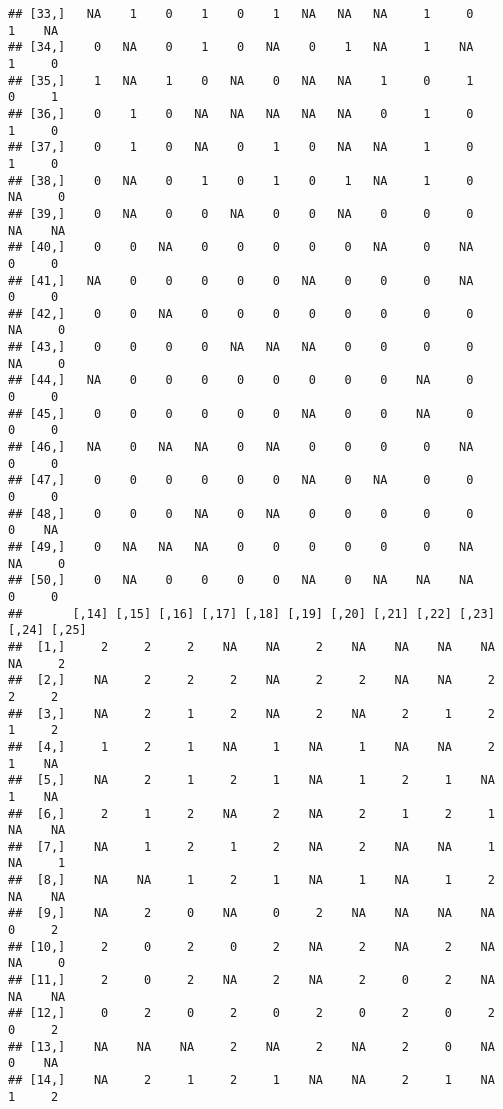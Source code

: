\documentclass[
]{article}
\begin{document}
\begin{verbatim}
## [33,]   NA    1    0    1    0    1   NA   NA   NA     1     0     1    NA
## [34,]    0   NA    0    1    0   NA    0    1   NA     1    NA     1     0
## [35,]    1   NA    1    0   NA    0   NA   NA    1     0     1     0     1
## [36,]    0    1    0   NA   NA   NA   NA   NA    0     1     0     1     0
## [37,]    0    1    0   NA    0    1    0   NA   NA     1     0     1     0
## [38,]    0   NA    0    1    0    1    0    1   NA     1     0    NA     0
## [39,]    0   NA    0    0   NA    0    0   NA    0     0     0    NA    NA
## [40,]    0    0   NA    0    0    0    0    0   NA     0    NA     0     0
## [41,]   NA    0    0    0    0    0   NA    0    0     0    NA     0     0
## [42,]    0    0   NA    0    0    0    0    0    0     0     0    NA     0
## [43,]    0    0    0    0   NA   NA   NA    0    0     0     0    NA     0
## [44,]   NA    0    0    0    0    0    0    0    0    NA     0     0     0
## [45,]    0    0    0    0    0    0   NA    0    0    NA     0     0     0
## [46,]   NA    0   NA   NA    0   NA    0    0    0     0    NA     0     0
## [47,]    0    0    0    0    0    0   NA    0   NA     0     0     0     0
## [48,]    0    0    0   NA    0   NA    0    0    0     0     0     0    NA
## [49,]    0   NA   NA   NA    0    0    0    0    0     0    NA    NA     0
## [50,]    0   NA    0    0    0    0   NA    0   NA    NA    NA     0     0
##       [,14] [,15] [,16] [,17] [,18] [,19] [,20] [,21] [,22] [,23] [,24] [,25]
##  [1,]     2     2     2    NA    NA     2    NA    NA    NA    NA    NA     2
##  [2,]    NA     2     2     2    NA     2     2    NA    NA     2     2     2
##  [3,]    NA     2     1     2    NA     2    NA     2     1     2     1     2
##  [4,]     1     2     1    NA     1    NA     1    NA    NA     2     1    NA
##  [5,]    NA     2     1     2     1    NA     1     2     1    NA     1    NA
##  [6,]     2     1     2    NA     2    NA     2     1     2     1    NA    NA
##  [7,]    NA     1     2     1     2    NA     2    NA    NA     1    NA     1
##  [8,]    NA    NA     1     2     1    NA     1    NA     1     2    NA    NA
##  [9,]    NA     2     0    NA     0     2    NA    NA    NA    NA     0     2
## [10,]     2     0     2     0     2    NA     2    NA     2    NA    NA     0
## [11,]     2     0     2    NA     2    NA     2     0     2    NA    NA    NA
## [12,]     0     2     0     2     0     2     0     2     0     2     0     2
## [13,]    NA    NA    NA     2    NA     2    NA     2     0    NA     0    NA
## [14,]    NA     2     1     2     1    NA    NA     2     1    NA     1     2

\end{verbatim}
\end{document}
